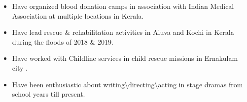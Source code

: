 

\divider


\divider


\begin{itemize}
\item Have organized blood donation camps in association with Indian Medical Association at multiple locations in Kerala.
\item Have lead rescue \& rehabilitation activities in Aluva and Kochi in Kerala during the floods of 2018 \& 2019.
\item Have worked with Childline services in child rescue missions in Ernakulam city .
\item Have been enthusiastic about writing\textbackslash directing\textbackslash acting in stage dramas from school years till present.
\end{itemize}
{}

